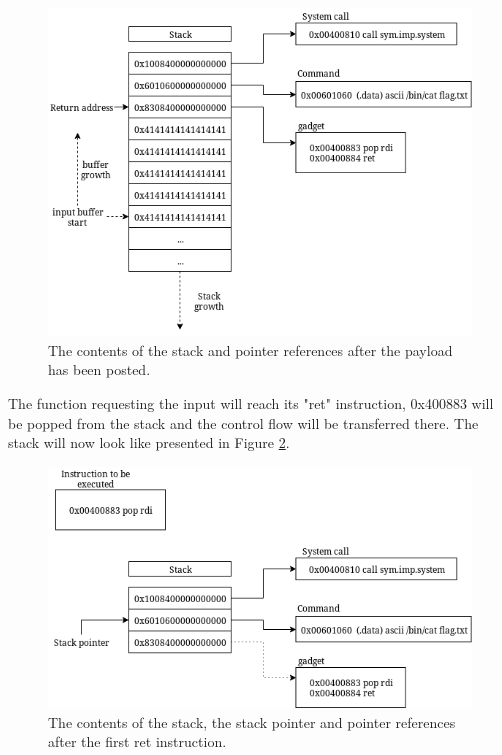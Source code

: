 \begin{figure}[h]
	\centering
	\includegraphics[width=\textwidth]{background/software-diversity/figures/after-payload}
	\caption{The contents of the stack and pointer references after the payload has been posted.}
	\label{fig:after-payload}
\end{figure}

The function requesting the input will reach its "ret" instruction, 0x400883 will be popped
from the stack and the control flow will be transferred there. The stack will now look like
presented in Figure \ref{fig:after-first}.

\begin{figure}[h]
	\centering
	\includegraphics[width=\textwidth]{background/software-diversity/figures/after-first}
	\caption{The contents of the stack, the stack pointer and pointer references after the first ret instruction.}
	\label{fig:after-first}
\end{figure}

